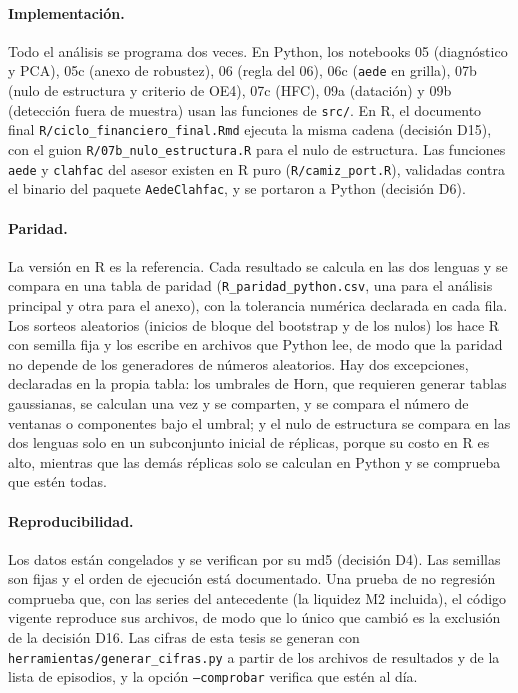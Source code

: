 \paragraph{Implementación.} Todo el análisis se programa dos veces. En Python, los notebooks 05
(diagnóstico y PCA), 05c (anexo de robustez), 06 (regla del 06), 06c (\texttt{aede} en grilla),
07b (nulo de estructura y criterio de OE4), 07c (HFC), 09a (datación) y 09b (detección fuera de
muestra) usan las funciones de \texttt{src/}. En R, el documento final
\texttt{R/ciclo\_financiero\_final.Rmd} ejecuta la misma cadena (decisión D15), con el guion
\texttt{R/07b\_nulo\_estructura.R} para el nulo de estructura. Las funciones \texttt{aede} y
\texttt{clahfac} del asesor existen en R puro (\texttt{R/camiz\_port.R}), validadas contra el binario
del paquete \texttt{AedeClahfac}, y se portaron a Python (decisión D6).

\paragraph{Paridad.} La versión en R es la referencia. Cada resultado se calcula en las dos lenguas
y se compara en una tabla de paridad (\texttt{R\_paridad\_python.csv}, una para el análisis
principal y otra para el anexo), con la tolerancia numérica declarada en cada fila. Los sorteos
aleatorios (inicios de bloque del bootstrap y de los nulos) los hace R con semilla fija y los
escribe en archivos que Python lee, de modo que la paridad no depende de los generadores de números
aleatorios. Hay dos excepciones, declaradas en la propia tabla: los umbrales de Horn, que requieren
generar tablas gaussianas, se calculan una vez y se comparten, y se compara el número de ventanas o
componentes bajo el umbral; y el nulo de estructura se compara en las dos lenguas solo en un
subconjunto inicial de réplicas, porque su costo en R es alto, mientras que las demás réplicas solo
se calculan en Python y se comprueba que estén todas.

\paragraph{Reproducibilidad.} Los datos están congelados y se verifican por su md5 (decisión D4).
Las semillas son fijas y el orden de ejecución está documentado. Una prueba de no regresión
comprueba que, con las series del antecedente (la liquidez M2 incluida), el código vigente
reproduce sus archivos, de modo
que lo único que cambió es la exclusión de la decisión D16. Las cifras de esta tesis se generan con
\texttt{herramientas/generar\_cifras.py} a partir de los archivos de resultados y de la lista de
episodios, y la opción \texttt{--comprobar} verifica que estén al día.
